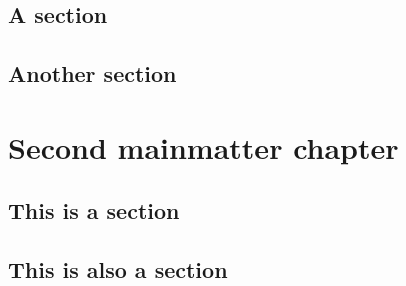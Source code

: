 \documentclass[noprint,nocopyright]{uit-thesis-test}
\begin{document}
\lipsum[1]

\section{A section}
\lipsum[3-8]

\section{Another section}
\lipsum[9]

\chapter{Second mainmatter chapter}

\lipsum[1]

\section{This is a section}
\lipsum[3-8]

\section{This is also a section}
\lipsum[9]
\end{document}
